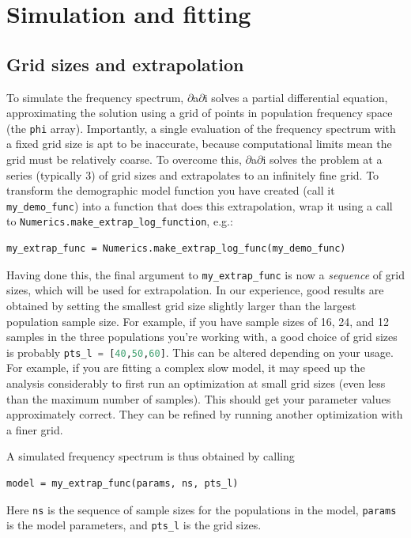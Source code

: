 \documentclass[12pt]{article}
\makeatletter
\newcommand{\dadi}{$\partial$a$\partial$i\xspace}
\newcommand{\py}[1]{\lstinline[language=Python, showstringspaces=False]@#1@}
\makeatother
\begin{document}
\section{Simulation and fitting}

\subsection{Grid sizes and extrapolation}

To simulate the frequency spectrum, \dadi solves a partial differential equation, approximating the solution using a grid of points in population frequency space (the \py{phi} array).
Importantly, a single evaluation of the frequency spectrum with a fixed grid size is apt to be inaccurate, because computational limits mean the grid must be relatively coarse.
To overcome this, \dadi solves the problem at a series (typically 3) of grid sizes and extrapolates to an infinitely fine grid.
To transform the demographic model function you have created (call it \py{my_demo_func}) into a function that does this extrapolation, wrap it using a call to \py{Numerics.make_extrap_log_function}, e.g.:
\begin{lstlisting}
my_extrap_func = Numerics.make_extrap_log_func(my_demo_func)
\end{lstlisting}
Having done this, the final argument to \py{my_extrap_func} is now a \emph{sequence} of grid sizes, which will be used for extrapolation.
In our experience, good results are obtained by setting the smallest grid size slightly larger than the largest population sample size.
For example, if you have sample sizes of 16, 24, and 12 samples in the three populations you're working with, a good choice of grid sizes is probably \py{pts_l = [40,50,60]}.
This can be altered depending on your usage. For example, if you are fitting a complex slow model, it may speed up the analysis considerably to first run an optimization at small grid sizes (even less than the maximum number of samples).
This should get your parameter values approximately correct.
They can be refined by running another optimization with a finer grid.

A simulated frequency spectrum is thus obtained by calling
\begin{lstlisting}
model = my_extrap_func(params, ns, pts_l)
\end{lstlisting}
Here \py{ns} is the sequence of sample sizes for the populations in the model, \py{params} is the model parameters, and \py{pts_l} is the grid sizes.
\end{document}
